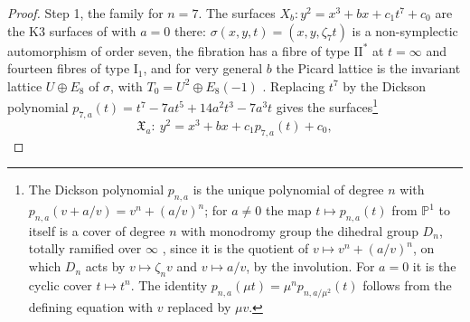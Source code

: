 \begin{proof}
Step 1, the family for $n=7$. The surfaces $X_{b}\colon y^{2}=x^{3}+bx+c_{1}t^{7}+c_{0}$ are the K3 surfaces of \cite[Ex.~6.1]{AST11} with $a=0$ there: $\sigma(x,y,t)=(x,y,\zeta_{7}t)$ is a non-symplectic automorphism of order seven, the fibration has a fibre of type $\mathrm{II}^{*}$ at $t=\infty$ and fourteen fibres of type $\mathrm{I}_{1}$, and for very general $b$ the Picard lattice is the invariant lattice $U\oplus E_{8}$ of $\sigma$, with $T_{0}=U^{2}\oplus E_{8}(-1)$ \cite[Table~3]{AST11}. Replacing $t^{7}$ by the Dickson polynomial $p_{7,a}(t)=t^{7}-7at^{5}+14a^{2}t^{3}-7a^{3}t$ gives the surfaces\footnote{The Dickson polynomial $p_{n,a}$ is the unique polynomial of degree $n$ with $p_{n,a}(v+a/v)=v^{n}+(a/v)^{n}$; for $a\ne0$ the map $t\mapsto p_{n,a}(t)$ from $\mathbb{P}^{1}$ to itself is a cover of degree $n$ with monodromy group the dihedral group $D_{n}$, totally ramified over $\infty$ \cite[Lem.~4.3]{vGS25}, since it is the quotient of $v\mapsto v^{n}+(a/v)^{n}$, on which $D_{n}$ acts by $v\mapsto\zeta_{n}v$ and $v\mapsto a/v$, by the involution. For $a=0$ it is the cyclic cover $t\mapsto t^{n}$. The identity $p_{n,a}(\mu t)=\mu^{n}p_{n,a/\mu^{2}}(t)$ follows from the defining equation with $v$ replaced by $\mu v$.}
\begin{equation}\label{eq:dickson7}
\mathfrak{X}_{a}\colon\ y^{2}=x^{3}+bx+c_{1}p_{7,a}(t)+c_{0},
\end{equation}

\end{proof}
